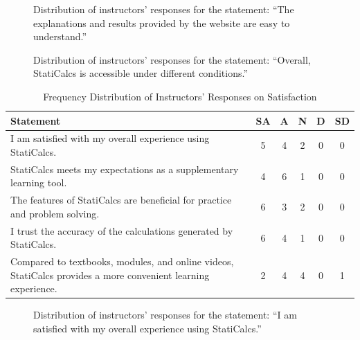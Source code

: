 \begin{figure}[H]
\centering
{}
\caption{Distribution of instructors' responses for the statement: ``The explanations and results provided by the website are easy to understand.''}
\end{figure}


\begin{figure}[H]
\centering
{}
\caption{Distribution of instructors' responses for the statement: ``Overall, StatiCalcs is accessible under different conditions.''}
\end{figure}



\begin{table}[H]
\centering
\caption{Frequency Distribution of Instructors’ Responses on Satisfaction}
\renewcommand{\arraystretch}{1.3}
\begin{tabular}{p{8cm}ccccc}
\hline
\textbf{Statement} & \textbf{SA} & \textbf{A} & \textbf{N} & \textbf{D} & \textbf{SD}\\
\hline
I am satisfied with my overall experience using StatiCalcs. & 5 & 4 & 2 & 0 & 0\\
StatiCalcs meets my expectations as a supplementary learning tool. & 4 & 6 & 1 & 0 & 0\\
The features of StatiCalcs are beneficial for practice and problem solving. & 6 & 3 & 2 & 0 & 0\\
I trust the accuracy of the calculations generated by StatiCalcs. & 6 & 4 & 1 & 0 & 0\\
Compared to textbooks, modules, and online videos, StatiCalcs provides a more convenient learning experience. & 2 & 4 & 4 & 0 & 1\\
\hline
\end{tabular}
\end{table}

\begin{figure}[H]
\centering
{}
\caption{Distribution of instructors' responses for the statement: ``I am satisfied with my overall experience using StatiCalcs.''}
\end{figure}


